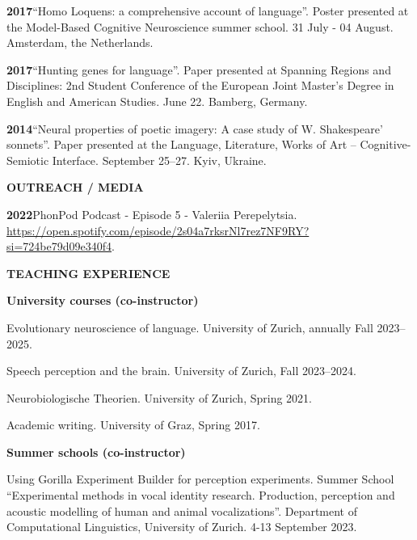 \documentclass[11pt]{article}
\newcommand{\hangpara}{
 \setlength{\parindent}{0in} %
 \hangindent=0.42in %
}
\begin{document}
\vskip 6pt
\hangpara
{\bf 2017}\hspace{1ex}“Homo Loquens: a comprehensive account of language”. Poster presented at the Model-Based Cognitive Neuroscience summer school. 31 July - 04 August. Amsterdam, the Netherlands.


\vskip 6pt
\hangpara
{\bf 2017}\hspace{1ex}“Hunting genes for language”. Paper presented at Spanning Regions and Disciplines: 2nd Student Conference of the European Joint Master's Degree in English and American Studies. June 22. Bamberg, Germany.


\vskip 6pt
\hangpara
{\bf 2014}\hspace{1ex}“Neural properties of poetic imagery: A case study of W. Shakespeare’ sonnets”. Paper presented at the Language, Literature, Works of Art – Cognitive-Semiotic Interface. September 25--27. Kyiv, Ukraine.


\vskip 20pt
\begin{flushleft}
{\bf OUTREACH / MEDIA}
\end{flushleft}

\hangpara
{\bf 2022}\hspace{1ex}PhonPod Podcast - Episode 5 - Valeriia Perepelytsia. \url{https://open.spotify.com/episode/2s04a7rksrNl7rez7NF9RY?si=724be79d09e340f4}.



\vskip 20pt
\begin{flushleft}
{\bf TEACHING EXPERIENCE}
\end{flushleft}
\begin{flushleft}
{\bf University courses (co-instructor)}
\end{flushleft}
\hangpara Evolutionary neuroscience of language. University of Zurich, annually Fall 2023--2025.
\vskip 6pt
\hangpara Speech perception and the brain. University of Zurich, Fall 2023--2024.
\vskip 6pt
\hangpara Neurobiologische Theorien. University of Zurich, Spring 2021.
\hangpara Academic writing. University of Graz, Spring 2017.




\begin{flushleft}
{\bf Summer schools (co-instructor)}
\end{flushleft}
\hangpara Using Gorilla Experiment Builder for perception experiments. Summer School “Experimental methods in vocal identity research. Production, perception and acoustic modelling of human and animal vocalizations”. Department of Computational Linguistics, University of Zurich. 4-13 September 2023.
\end{document}
